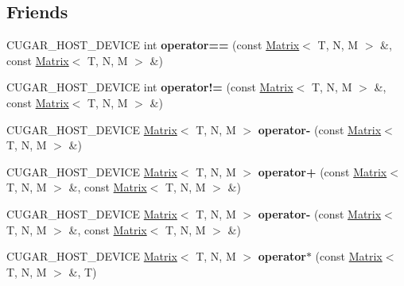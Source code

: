 \subsection*{Friends}
\begin{DoxyCompactItemize}
\item 
\mbox{\label{structcugar_1_1_matrix_aabd280629b89d1ac6c86a1272d69c290}} 
C\+U\+G\+A\+R\+\_\+\+H\+O\+S\+T\+\_\+\+D\+E\+V\+I\+CE int {\bfseries operator==} (const \hyperlink{structcugar_1_1_matrix}{Matrix}$<$ T, N, M $>$ \&, const \hyperlink{structcugar_1_1_matrix}{Matrix}$<$ T, N, M $>$ \&)
\item 
\mbox{\label{structcugar_1_1_matrix_aedc8c7d7a6c756d81fa516d6d81ae15c}} 
C\+U\+G\+A\+R\+\_\+\+H\+O\+S\+T\+\_\+\+D\+E\+V\+I\+CE int {\bfseries operator!=} (const \hyperlink{structcugar_1_1_matrix}{Matrix}$<$ T, N, M $>$ \&, const \hyperlink{structcugar_1_1_matrix}{Matrix}$<$ T, N, M $>$ \&)
\item 
\mbox{\label{structcugar_1_1_matrix_a2c4801e2ac2ee9aca9ae52565f58ed5c}} 
C\+U\+G\+A\+R\+\_\+\+H\+O\+S\+T\+\_\+\+D\+E\+V\+I\+CE \hyperlink{structcugar_1_1_matrix}{Matrix}$<$ T, N, M $>$ {\bfseries operator-\/} (const \hyperlink{structcugar_1_1_matrix}{Matrix}$<$ T, N, M $>$ \&)
\item 
\mbox{\label{structcugar_1_1_matrix_a8a84070b5ee31d7e69040b5a50028d2d}} 
C\+U\+G\+A\+R\+\_\+\+H\+O\+S\+T\+\_\+\+D\+E\+V\+I\+CE \hyperlink{structcugar_1_1_matrix}{Matrix}$<$ T, N, M $>$ {\bfseries operator+} (const \hyperlink{structcugar_1_1_matrix}{Matrix}$<$ T, N, M $>$ \&, const \hyperlink{structcugar_1_1_matrix}{Matrix}$<$ T, N, M $>$ \&)
\item 
\mbox{\label{structcugar_1_1_matrix_a9a5b0c44298ee963a8e85e3b5dd62de0}} 
C\+U\+G\+A\+R\+\_\+\+H\+O\+S\+T\+\_\+\+D\+E\+V\+I\+CE \hyperlink{structcugar_1_1_matrix}{Matrix}$<$ T, N, M $>$ {\bfseries operator-\/} (const \hyperlink{structcugar_1_1_matrix}{Matrix}$<$ T, N, M $>$ \&, const \hyperlink{structcugar_1_1_matrix}{Matrix}$<$ T, N, M $>$ \&)
\item 
\mbox{\label{structcugar_1_1_matrix_af7e04aaef884c2cad0ed25f97e8ed8c7}} 
C\+U\+G\+A\+R\+\_\+\+H\+O\+S\+T\+\_\+\+D\+E\+V\+I\+CE \hyperlink{structcugar_1_1_matrix}{Matrix}$<$ T, N, M $>$ {\bfseries operator$\ast$} (const \hyperlink{structcugar_1_1_matrix}{Matrix}$<$ T, N, M $>$ \&, T)

\end{DoxyCompactItemize}
